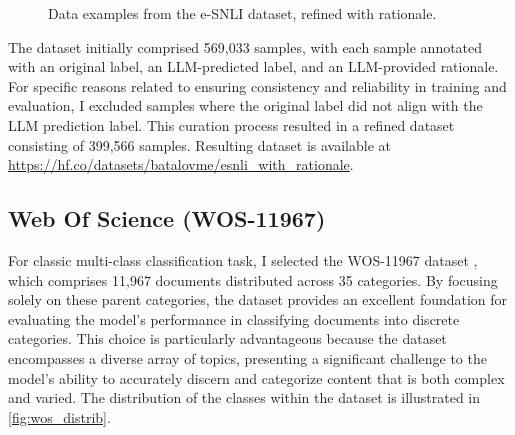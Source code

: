 \begin{figure}[hbt]
    \centering
    \begin{subfigure}[t]{.5\linewidth}
        \centering
        
    \end{subfigure}%
    \begin{subfigure}[t]{.5\linewidth}
        \centering
        
    \end{subfigure}

    \caption{Data examples from the e-SNLI dataset, refined with rationale.}
    \label{fig:rationale_dataset}
\end{figure}

The dataset initially comprised 569,033 samples, with each sample annotated with an original label, an LLM-predicted label, and an LLM-provided rationale. For specific reasons related to ensuring consistency and reliability in training and evaluation, I excluded samples where the original label did not align with the LLM prediction label. This curation process resulted in a refined dataset consisting of 399,566 samples. Resulting dataset is available at \linebreak \url{https://hf.co/datasets/batalovme/esnli_with_rationale}.

\subsection{Web Of Science (WOS-11967)}
\label{sec:wos}

For classic multi-class classification task, I selected the WOS-11967 dataset \cite{wos}, which comprises 11,967 documents distributed across 35 categories. By focusing solely on these parent categories, the dataset provides an excellent foundation for evaluating the model’s performance in classifying documents into discrete categories. This choice is particularly advantageous because the dataset encompasses a diverse array of topics, presenting a significant challenge to the model's ability to accurately discern and categorize content that is both complex and varied. The distribution of the classes within the dataset is illustrated in \autoref{fig:wos_distrib}.


